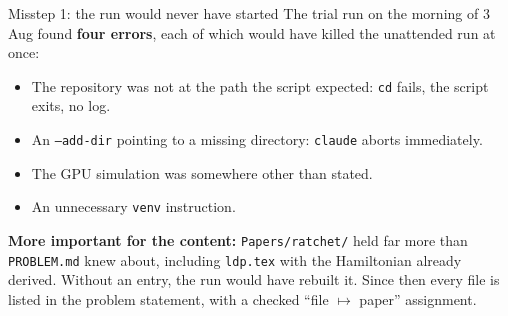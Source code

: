 \documentclass[11pt,aspectratio=169]{beamer}
\newcommand{\datei}[1]{\texttt{#1}}
\begin{document}
\begin{frame}{Misstep 1: the run would never have started}
  The trial run on the morning of 3 Aug found \textbf{four errors}, each of which would
  have killed the unattended run at once:
  \begin{itemize}
  \item The repository was not at the path the script expected:
    \texttt{cd} fails, the script exits, no log.
  \item An \texttt{--add-dir} pointing to a missing directory: \texttt{claude} aborts
    immediately.
  \item The GPU simulation was somewhere other than stated.
  \item An unnecessary \texttt{venv} instruction.
  \end{itemize}
  \medskip
  \textbf{More important for the content:} \datei{Papers/ratchet/} held far more than
  \datei{PROBLEM.md} knew about, including \datei{ldp.tex} with the Hamiltonian already
  derived. Without an entry, the run would have rebuilt it. Since then every file is listed
  in the problem statement, with a checked \enquote{file $\mapsto$ paper} assignment.
\end{frame}
\end{document}
